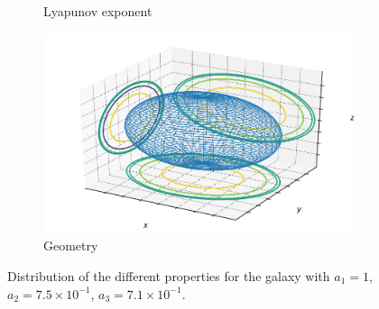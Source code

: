 \begin{figure}[h]
\begin{subfigure}[t]{0.4\textwidth}
        \caption{Lyapunov exponent}
    \end{subfigure}
    \begin{subfigure}[t]{0.4\textwidth}
        \includegraphics[width=\textwidth]{"../Files/Week 13/images/12_ellipsoid"}
        \caption{Geometry}
    \end{subfigure}
    \caption{Distribution of the different properties for the galaxy with $a_1 = 1$, $a_2 = 7.5\times10^{-1}$, $a_3 = 7.1\times10^{-1}$.}
\end{figure}


